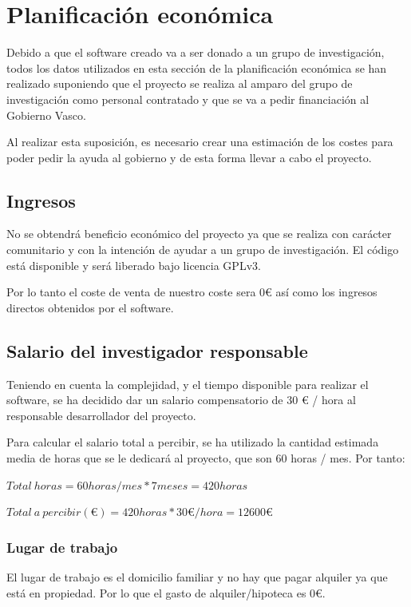 \section{Planificaci\'{o}n econ\'{o}mica}
Debido a que el software creado va a ser donado a un grupo de investigaci\'on, todos los datos
utilizados en esta secci\'on de la planificaci\'on econ\'omica se han realizado suponiendo
que el proyecto se realiza al amparo del grupo de investigaci\'on como personal contratado y que se va a pedir
financiaci\'on al Gobierno Vasco.

Al realizar esta suposici\'on, es necesario crear una estimaci\'on de los costes para poder
pedir la ayuda al gobierno y de esta forma llevar a cabo el proyecto.

\subsection{Ingresos}
No se obtendr\'{a} beneficio econ\'{o}mico del proyecto ya que se realiza con car\'acter comunitario y con la intenci\'on
de ayudar a un grupo de investigaci\'on. El c\'odigo est\'a disponible y ser\'a liberado bajo licencia GPLv3.

Por lo tanto el coste de venta de nuestro coste sera 0€ as\'i como los ingresos directos obtenidos por el software.

\subsection{Salario del investigador responsable}
Teniendo en cuenta la complejidad, y el tiempo disponible para realizar el software, se ha
decidido dar un salario compensatorio de 30 € / hora al responsable desarrollador del proyecto.

Para calcular el salario total a percibir, se ha utilizado la cantidad estimada media de horas
que se le dedicar\'a al proyecto, que son 60 horas / mes.
Por tanto:

\begin{center}
	$ Total \ horas = 60 horas / mes * 7 meses = 420 horas $
	
	$ Total \ a \ percibir (€) = 420 horas * 30 € / hora = 12600 € $
\end{center}

\subsubsection{Lugar de trabajo}
El lugar de trabajo es el domicilio familiar y no hay que pagar alquiler ya que est\'a en
propiedad. Por lo que el gasto de alquiler/hipoteca es 0€.

